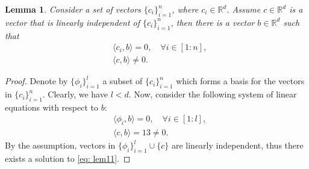 \documentclass[accepted]{uai2022}
\newtheorem{lemma}{Lemma}
\begin{document}
       \begin{lemma}\label{lemma: lin indep formal}
            Consider a set of vectors $\{c_i\}_{i=1}^{n}$, where $c_i \in \mathbb{R}^d$. Assume $c\in \mathbb{R}^d$ is a vector that is linearly independent of $\{c_i\}_{i=1}^{n}$, then there is a vector $b\in \mathbb{R}^d$ such that
            \begin{align*}
                & \langle c_i, b \rangle = 0, \quad \forall i \in [1:n],\\
                & \langle c, b \rangle \neq 0.
            \end{align*}
        \end{lemma}
        \begin{proof}
            Denote by $\{\phi_i\}_{i=1}^{l}$ a subset of $\{c_i\}_{i=1}^{n}$ which forms a basis for the vectors in $\{c_i\}_{i=1}^{n}$. Clearly, we have $l < d$. Now, consider the following system of linear equations with respect to $b$:
            \begin{equation} \label{eq: lem11}
            \begin{split}
                & \langle \phi_i, b \rangle = 0, \quad \forall i\in[1:l], \\
                & \langle c, b \rangle = 13\neq0.
            \end{split}
            \end{equation}
            By the assumption, vectors in $\{\phi_i\}_{i=1}^{l}\cup\{c\}$ are linearly independent, thus there exists a solution to \eqref{eq: lem11}.
        \end{proof}
\end{document}
